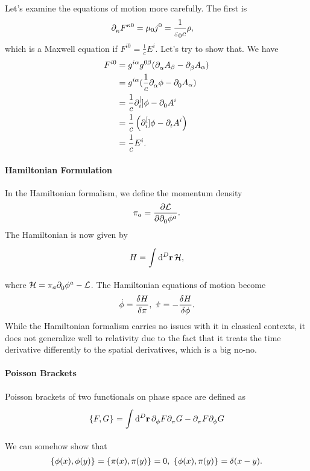 Let's examine the equations of motion more carefully. The first is
\begin{align*}
	\partial^{}_{\kappa}{F^{\kappa 0}} &= \mu_{0}j^{0} = \frac{1}{\varepsilon_{0}c}\rho,
\end{align*}
which is a Maxwell equation if $F^{i 0} = \frac{1}{c}E^{i}$. Let's try to show that. We have
\begin{align*}
	F^{i0} &= g^{i\alpha}g^{0\beta}(\partial^{}_{\alpha}{A_{\beta}} - \partial^{}_{\beta}{A_{\alpha}}) \\
	       &= g^{i\alpha}(\frac{1}{c}\partial^{}_{\alpha}{\phi} - \partial^{}_{0}{A_{\alpha}}) \\
	       &= \frac{1}{c}\partial^{[}_{i}]{}{\phi} - \partial^{}_{0}{A^{i}} \\
	       &= \frac{1}{c}\left(\partial^{[}_{i}]{}{\phi} - \partial^{}_{t}{A^{i}}\right) \\
	       &= \frac{1}{c}E^{i}.
\end{align*}

\paragraph{Hamiltonian Formulation}
In the Hamiltonian formalism, we define the momentum density
\begin{align*}
	\pi_{a} = \pdv{\ensuremath{\mathcal{L}}}{\ensuremath{\partial^{}_{0}}\phi^{a}}.
\end{align*}
The Hamiltonian is now given by
\begin{align*}
	H = \int\limits_{}^{}\dd[D]{\vb{r}}\mathcal{H},
\end{align*}
where $\mathcal{H} = \pi_{a}\partial^{}_{0}{\phi^{a}} - \mathcal{L}$. The Hamiltonian equations of motion become
\begin{align*}
	\dot{\phi} = \fdv{H}{\pi},\ \dot{\pi} = -\fdv{H}{\phi}.
\end{align*}
While the Hamiltonian formalism carries no issues with it in classical contexts, it does not generalize well to relativity due to the fact that it treats the time derivative differently to the spatial derivatives, which is a big no-no.


\paragraph{Poisson Brackets}
Poisson brackets of two functionals on phase space are defined as
\begin{align*}
	\left\{F, G\right\}_{} = \int\limits_{}^{}\dd[D]{\vb{r}}{\ensuremath{\partial^{}_{\phi}}{F}\ensuremath{\partial^{}_{\pi}}{G} - \ensuremath{\partial^{}_{\pi}}{F}\ensuremath{\partial^{}_{\phi}}{G}}
\end{align*}
We can somehow show that
\begin{align*}
\pob{\phi(x)}{\phi(y)} = \pob{\pi(x)}{\pi(y)} = 0,\ \pob{\phi(x)}{\pi(y)} = \delta(x - y).
\end{align*}

